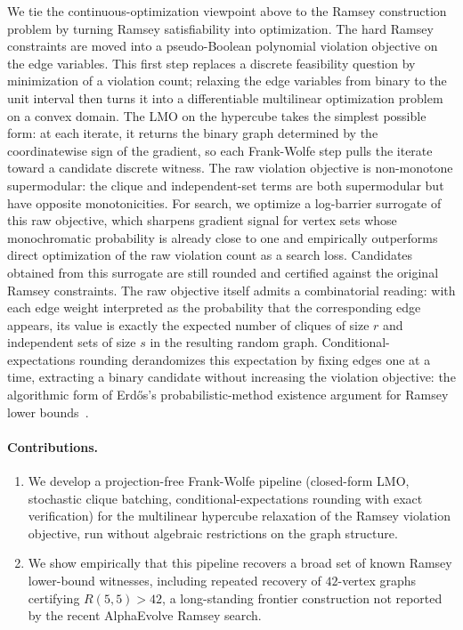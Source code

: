 \documentclass{article}
\begin{document}
We tie the continuous-optimization viewpoint above to the Ramsey construction problem by turning Ramsey satisfiability into optimization. The hard Ramsey constraints are moved into a pseudo-Boolean polynomial violation objective on the edge variables. This first step replaces a discrete feasibility question by minimization of a violation count; relaxing the edge variables from binary to the unit interval then turns it into a differentiable multilinear optimization problem on a convex domain. The LMO on the hypercube takes the simplest possible form: at each iterate, it returns the binary graph determined by the coordinatewise sign of the gradient, so each Frank-Wolfe step pulls the iterate toward a candidate discrete witness. The raw violation objective is non-monotone supermodular: the clique and independent-set terms are both supermodular but have opposite monotonicities. For search, we optimize a log-barrier surrogate of this raw objective, which sharpens gradient signal for vertex sets whose monochromatic probability is already close to one and empirically outperforms direct optimization of the raw violation count as a search loss. Candidates obtained from this surrogate are still rounded and certified against the original Ramsey constraints. The raw objective itself admits a combinatorial reading: with each edge weight interpreted as the probability that the corresponding edge appears, its value is exactly the expected number of cliques of size $r$ and independent sets of size $s$ in the resulting random graph. Conditional-expectations rounding derandomizes this expectation by fixing edges one at a time, extracting a binary candidate without increasing the violation objective: the algorithmic form of Erd\H{o}s's probabilistic-method existence argument for Ramsey lower bounds~\cite{erdos1947remarks}.

\paragraph{Contributions.}
\begin{enumerate}
    \item We develop a projection-free Frank-Wolfe pipeline (closed-form LMO, stochastic clique batching, conditional-expectations rounding with exact verification) for the multilinear hypercube relaxation of the Ramsey violation objective, run without algebraic restrictions on the graph structure.
    \item We show empirically that this pipeline recovers a broad set of known Ramsey lower-bound witnesses, including repeated recovery of $42$-vertex graphs certifying $R(5,5)>42$, a long-standing frontier construction not reported by the recent AlphaEvolve Ramsey search.
\end{enumerate}
\end{document}

